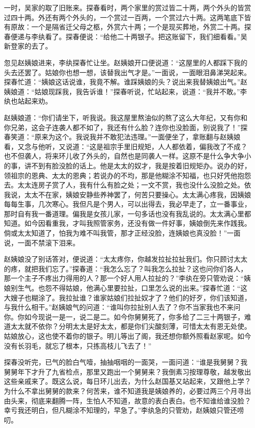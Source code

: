 一时，吴家的取了旧账来。探春看时，两个家里的赏过皆二十两，两个外头的皆赏过四十两。外还有两个外头的，一个赏过一百两，一个赏过六十两。这两笔底下皆有原故：一个是隔省迁父母之柩，外赏六十两；一个是现买葬地，外赏二十两。探春便递与李纨看了。探春便说：``给他二十两银子。把这账留下，我们细看看。''吴新登家的去了。

忽见赵姨娘进来，李纨探春忙让坐。赵姨娘开口便说道：``这屋里的人都踩下我的头去还罢了。姑娘你也想一想，该替我出气才是。''一面说，一面眼泪鼻涕哭起来。探春忙道：``姨娘这话说谁，我竟不解。谁踩姨娘的头？说出来我替姨娘出气。''赵姨娘道：``姑娘现踩我，我告诉谁！''探春听说，忙站起来，说道：``我并不敢。''李纨也站起来劝。

赵姨娘道：``你们请坐下，听我说。我这屋里熬油似的熬了这么大年纪，又有你和你兄弟，这会子连袭人都不如了，我还有什么脸？连你也没脸面，别说我了！''探春笑道：``原来为这个。我说我并不敢犯法违理。''一面便坐了，拿账翻与赵姨娘看，又念与他听，又说道：``这是祖宗手里旧规矩，人人都依着，偏我改了不成？也不但袭人，将来环儿收了外头的，自然也是同袭人一样。这原不是什么争大争小的事，讲不到有脸没脸的话上。他是太太的奴才，我是按着旧规矩办。说办的好，领祖宗的恩典、太太的恩典；若说办的不均，那是他糊涂不知福，也只好凭他抱怨去。太太连房子赏了人，我有什么有脸之处；一文不赏，我也没什么没脸之处。依我说，太太不在家，姨娘安静些养神罢了，何苦只要操心。太太满心疼我，因姨娘每每生事，几次寒心。我但凡是个男人，可以出得去，我必早走了，立一番事业，那时自有我一番道理。偏我是女孩儿家，一句多话也没有我乱说的。太太满心里都知道。如今因看重我，才叫我照管家务，还没有做一件好事，姨娘倒先来作践我。倘或太太知道了，怕我为难不叫我管，那才正经没脸，连姨娘也真没脸！''一面说，一面不禁滚下泪来。

赵姨娘没了别话答对，便说道：``太太疼你，你越发拉扯拉扯我们。你只顾讨太太的疼，就把我们忘了。''探春道：``我怎么忘了？叫我怎么拉扯？这也问你们各人，那一个主子不疼出力得用的人？那一个好人用人拉扯的？''李纨在旁只管劝说：``姨娘别生气。也怨不得姑娘，他满心里要拉扯，口里怎么说的出来。''探春忙道：``这大嫂子也糊涂了。我拉扯谁？谁家姑娘们拉扯奴才了？他们的好歹，你们该知道，与我什么相干。''赵姨娘气的问道：``谁叫你拉扯别人去了？你不当家我也不来问你。你如今现说一是一，说二是二。如今你舅舅死了，你多给了二三十两银子，难道太太就不依你？分明太太是好太太，都是你们尖酸刻薄，可惜太太有恩无处使。姑娘放心，这也使不着你的银子。明儿等出了阁，我还想你额外照看赵家呢。如今没有长羽毛，就忘了根本，只拣高枝儿飞去了！''

探春没听完，已气的脸白气噎，抽抽咽咽的一面哭，一面问道：``谁是我舅舅？我舅舅年下才升了九省检点，那里又跑出一个舅舅来？我倒素习按理尊敬，越发敬出这些亲戚来了。既这么说，每日环儿出去，为什么赵国基又站起来，又跟他上学？为什么不拿出舅舅的款来？何苦来，谁不知道我是姨娘养的，必要过两三个月寻出由头来，彻底来翻腾一阵，生怕人不知道，故意的表白表白。也不知谁给谁没脸？幸亏我还明白，但凡糊涂不知理的，早急了。''李纨急的只管劝，赵姨娘只管还唠叨。

